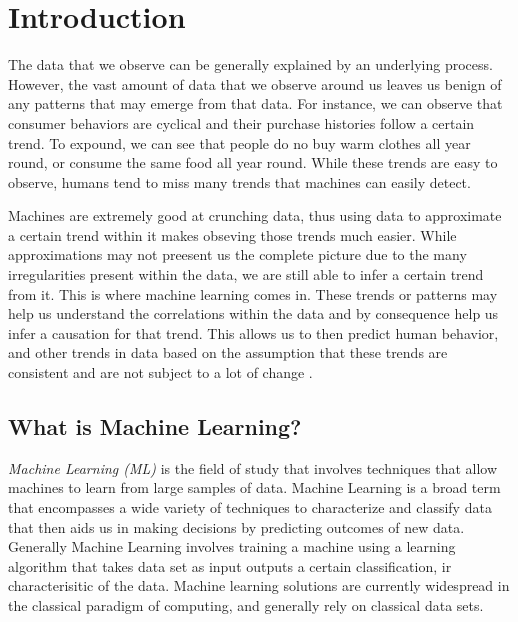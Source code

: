 \documentclass{article}
\begin{document}
\section{Introduction}
\par
The data that we observe can be generally explained by an underlying process.
However, the vast amount of data that we observe around us leaves us benign of any patterns that may emerge from that data. For instance, we can observe that consumer behaviors are cyclical and their purchase histories follow a certain trend. To expound, we can see that people do no buy warm clothes all year round, or consume the same food all year round. While these trends are easy to observe, humans tend to miss many trends that machines can easily detect. 
\par
Machines are extremely good at crunching data, thus using data to approximate a certain trend within it makes obseving those trends much easier. While approximations may not preesent us the complete picture due to the many irregularities present within the data, we are still able to infer a certain trend from it. This is where machine learning comes in. These trends or patterns may help us understand the correlations within the data and by consequence help us infer a causation for that trend. This allows us to then predict human behavior, and other trends in data based on the assumption that these trends are consistent and are not subject to a lot of change \cite{BOOK:3}.
\subsection{What is Machine Learning?}
\par\textit{Machine Learning (ML)} is the field of study that involves techniques that allow machines to learn from large samples of data. Machine Learning is a broad term that encompasses a wide variety of techniques to characterize and classify data that then aids us in making decisions by predicting outcomes of new data. Generally Machine Learning involves training a machine using a learning algorithm that takes data set as input outputs a certain classification, ir characterisitic of the data. Machine learning solutions are currently widespread in the classical paradigm of computing, and generally rely on classical data sets.\cite {inproceedings}
\end{document}
